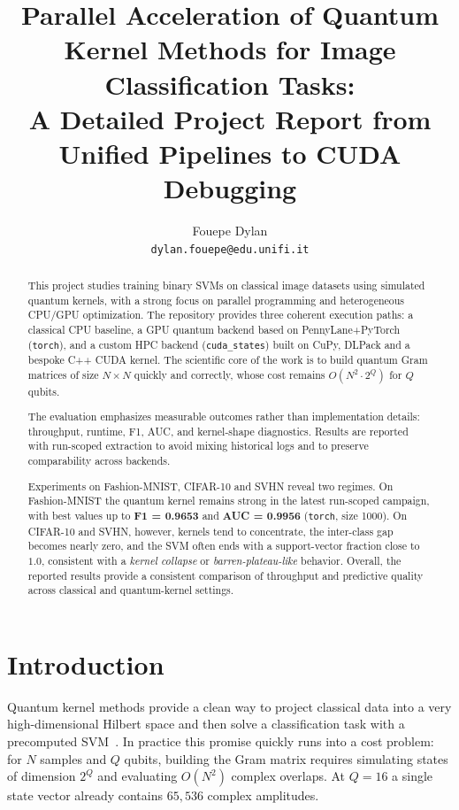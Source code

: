 \documentclass[10pt,twocolumn,letterpaper]{article}
\begin{document}
\title{Parallel Acceleration of Quantum Kernel Methods for Image Classification Tasks: \\ A Detailed Project Report from Unified Pipelines to CUDA Debugging}

\author{Fouepe Dylan\\
{\tt\small dylan.fouepe@edu.unifi.it}}

\maketitle
\thispagestyle{empty}

\begin{abstract}
This project studies training binary SVMs on classical image datasets using simulated quantum kernels, with a strong focus on parallel programming and heterogeneous CPU/GPU optimization. The repository provides three coherent execution paths: a classical CPU baseline, a GPU quantum backend based on PennyLane+PyTorch (\texttt{torch}), and a custom HPC backend (\texttt{cuda\_states}) built on CuPy, DLPack and a bespoke C++ CUDA kernel. The scientific core of the work is to build quantum Gram matrices of size $N \times N$ quickly and correctly, whose cost remains $O(N^2 \cdot 2^Q)$ for $Q$ qubits.

The evaluation emphasizes measurable outcomes rather than implementation details: throughput, runtime, F1, AUC, and kernel-shape diagnostics. Results are reported with run-scoped extraction to avoid mixing historical logs and to preserve comparability across backends.

Experiments on Fashion-MNIST, CIFAR-10 and SVHN reveal two regimes. On Fashion-MNIST the quantum kernel remains strong in the latest run-scoped campaign, with best values up to \textbf{F1 = 0.9653} and \textbf{AUC = 0.9956} (\texttt{torch}, size 1000). On CIFAR-10 and SVHN, however, kernels tend to concentrate, the inter-class gap becomes nearly zero, and the SVM often ends with a support-vector fraction close to $1.0$, consistent with a \emph{kernel collapse} or \emph{barren-plateau-like} behavior. Overall, the reported results provide a consistent comparison of throughput and predictive quality across classical and quantum-kernel settings.
\end{abstract}

\section{Introduction}
Quantum kernel methods provide a clean way to project classical data into a very high-dimensional Hilbert space and then solve a classification task with a precomputed SVM~\cite{havlicek2019supervised}. In practice this promise quickly runs into a cost problem: for $N$ samples and $Q$ qubits, building the Gram matrix requires simulating states of dimension $2^Q$ and evaluating $O(N^2)$ complex overlaps. At $Q=16$ a single state vector already contains $65{,}536$ complex amplitudes.
\end{document}
